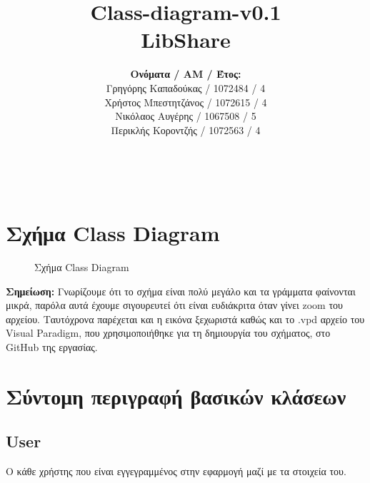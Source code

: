 \documentclass[12pt,a4paper]{article}
\title{Class-diagram-v0.1 \\ LibShare}
\author{\textbf{Ονόματα / ΑΜ / Έτος:} \\ Γρηγόρης Καπαδούκας / 1072484 / 4\textdegree \\ Χρήστος Μπεστητζάνος / 1072615 / 4\textdegree \\ Νικόλαος Αυγέρης / 1067508 / 5\textdegree \\ Περικλής Κοροντζής / 1072563 / 4\textdegree}
\begin{document}
\makeatletter
\begin{center}
	\LARGE{\@title} \\
	\pagebreak
    \begin{LARGE}\@author\end{LARGE} 
    \pagebreak
\end{center}

\section{Σχήμα Class Diagram}

\begin{figure}[H]
	\caption{Σχήμα Class Diagram}
	\label{Σχήμα Class Diagram}
\end{figure}

\textbf{Σημείωση:} Γνωρίζουμε ότι το σχήμα είναι πολύ μεγάλο και τα γράμματα φαίνονται μικρά, παρόλα αυτά έχουμε σιγουρευτεί ότι είναι ευδιάκριτα όταν γίνει zoom του αρχείου. Ταυτόχρονα παρέχεται και η εικόνα ξεχωριστά καθώς και το .vpd αρχείο του Visual Paradigm, που χρησιμοποιήθηκε για τη δημιουργία του σχήματος, στο GitHub της εργασίας.

\section{Σύντομη περιγραφή βασικών κλάσεων}

\subsection{User}
Ο κάθε χρήστης που είναι εγγεγραμμένος στην εφαρμογή μαζί με τα στοιχεία του. 
\end{document}
